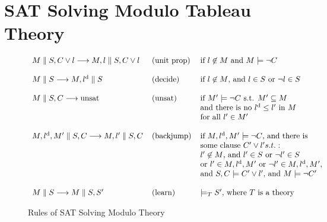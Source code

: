 
\section{SAT Solving Modulo Tableau Theory}

\begin{figure}[htbp]
\parbox{\textwidth}
{\small
\begin{center}
$\begin{array}{l@{\hspace{0.4cm}}l@{\hspace{0.4cm}}l}
M\parallel{}S,C\lor{}l\longrightarrow{}M,l\parallel{}S,C\lor{}l &
(\mathrm{unit~prop}) & \mbox{if }l\not\in{}M\mbox{ and }M\models{}\neg{}C\\\\

M\parallel{}S\longrightarrow{}M,l^\mathrm{d}\parallel{}S & (\mathrm{decide}) &
\mbox{if }l\not\in{}M\mbox{, and }l\in{}S\mbox{ or }\neg{}l\in{}S\\\\

M\parallel{}S,C\longrightarrow\mathrm{unsat} & (\mathrm{unsat}) &
\mbox{if }M'\models{}\neg{}C\mbox{ s.t. }M'\subseteq{}M\\
&& \mbox{and there is no }l^\mathrm{d}\leq{}l'\mbox{ in }M\\
&& \mbox{for all }l'\in{}M'\\\\
 
M,l^\mathrm{d},M'\parallel{}S,C\longrightarrow{}M,l'\parallel{}S,C &
(\mathrm{backjump}) & \mbox{if }M,l^\mathrm{d},M'\models\neg{}C
\mbox{, and there is}\\
&& \mbox{some clause }C'\lor{}l' s.t.:\\
&& l'\not\in{}M\mbox{, and }l'\in{}S\mbox{ or }\neg{}l'\in{}S\\
&& \mbox{or }l'\in{}M,l^\mathrm{d},M'\mbox{ or }
\neg{}l'\in{}M,l^\mathrm{d},M',\\
&& \mbox{and }S,C\models{}C'\lor{}l'\mbox{, and }M\models\neg{}C'\\\\

M\parallel{}S\longrightarrow{}M\parallel{}S,S'
& (\mathrm{learn}) & \models_TS'\mbox{, where }T\mbox{ is a theory}
\end{array}$
\end{center}}
\caption{Rules of SAT Solving Modulo Theory}
\label{fig:smt}
\end{figure}

